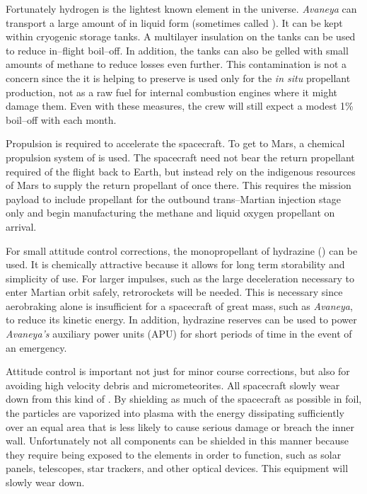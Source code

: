 Fortunately hydrogen is the lightest known element in the universe. {\it Avaneya} can transport a large amount of  in liquid form (sometimes called ). It can be kept within cryogenic storage tanks. A multilayer insulation on the tanks can be used to reduce in--flight boil--off. In addition, the tanks can also be gelled with small amounts of methane to reduce losses even further. This  contamination is not a concern since the  it is helping to preserve is used only for the {\it in situ} propellant production, not as a raw fuel for internal combustion engines where it might damage them. Even with these measures, the crew will still expect a modest 1\% boil--off with each month.

Propulsion is required to accelerate the spacecraft. To get to Mars, a chemical propulsion system of  is used. The spacecraft need not bear the return propellant required of the flight back to Earth, but instead rely on the indigenous resources of Mars to supply the return propellant of  once there. This requires the mission payload to include propellant for the outbound trans--Martian injection stage only and begin manufacturing the methane and liquid oxygen propellant on arrival. 

For small attitude control corrections, the monopropellant of hydrazine () can be used. It is chemically attractive because it allows for long term storability and simplicity of use. For larger impulses, such as the large deceleration necessary to enter Martian orbit safely, retrorockets will be needed. This is necessary since aerobraking alone is insufficient for a spacecraft of great mass, such as {\it Avaneya}, to reduce its kinetic energy. In addition, hydrazine reserves can be used to power {\it Avaneya's} auxiliary power units (APU) for short periods of time in the event of an emergency.

Attitude control is important not just for minor course corrections, but also for avoiding high velocity debris and micrometeorites. All spacecraft slowly wear down from this kind of . By shielding as much of the spacecraft as possible in foil, the particles are vaporized into plasma with the energy dissipating sufficiently over an equal area that is less likely to cause serious damage or breach the inner wall. Unfortunately not all components can be shielded in this manner because they require being exposed to the elements in order to function, such as solar panels, telescopes, star trackers, and other optical devices. This equipment will slowly wear down.

